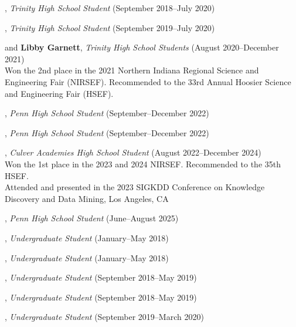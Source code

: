\documentclass[10pt]{article}
\newenvironment{myindentpar}[1]%
{\begin{list}{}%
         {\setlength{\leftmargin}{#1}}%
         \item[]%
}
{\end{list}}
\newcounter{list}
\begin{document}
\begin{myindentpar}{0.75cm}

\hspace{-0.75cm}{\bf Eric Zhang}, \textit{Trinity High School Student} (September 2018--July 2020)

\hspace{-0.75cm}{\bf Michael Florin}, \textit{Trinity High School Student} (September 2019--July 2020)

\hspace{-0.75cm}{\bf Rebekah Fang} and {\bf Libby Garnett}, \textit{Trinity High School Students} (August 2020--December 2021) \\
	Won the 2nd place in the 2021 Northern Indiana Regional Science and Engineering Fair (NIRSEF). Recommended to the 33rd Annual Hoosier Science and Engineering Fair (HSEF).

\hspace{-0.75cm}{\bf Ishita Masetty}, \textit{Penn High School Student} (September--December 2022)

\hspace{-0.75cm}{\bf Jake Ciliberti}, \textit{Penn High School Student} (September--December 2022)

\hspace{-0.75cm}{\bf Albert Lu}, \textit{Culver Academies High School Student} (August 2022--December 2024) \\
	{Won the 1st place in the 2023 and 2024 NIRSEF. Recommended to the 35th HSEF.} \\
	{Attended and presented in the 2023 SIGKDD Conference on Knowledge Discovery and Data Mining, Los Angeles, CA}

\hspace{-0.75cm}{\bf Kaiyi Zhao}, \textit{Penn High School Student} (June--August 2025)

\hspace{-0.75cm}{\bf Matthew Malir}, \textit{Undergraduate Student} (January--May 2018)
	
\hspace{-0.75cm}{\bf Sebastian Miner}, \textit{Undergraduate Student} (January--May 2018)

\hspace{-0.75cm}{\bf Matthew Schoenbauer}, \textit{Undergraduate Student} (September 2018--May 2019)
	
\hspace{-0.75cm}{\bf Yuhan (Tina) Wu}, \textit{Undergraduate Student} (September 2018--May 2019)

\hspace{-0.75cm}{\bf Chan Hee Song}, \textit{Undergraduate Student} (September 2019--March 2020)


\end{myindentpar}
\end{document}
